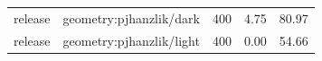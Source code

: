 \begin{longtable}{l>{\raggedright\arraybackslash}p{.42\linewidth}rrr}
release & %
geometry:pjhanzlik/dark & %
400 & %
4.75 & %
80.97 \\ %

release & %
geometry:pjhanzlik/light & %
400 & %
0.00 & %
54.66 \\ %


\end{longtable}
